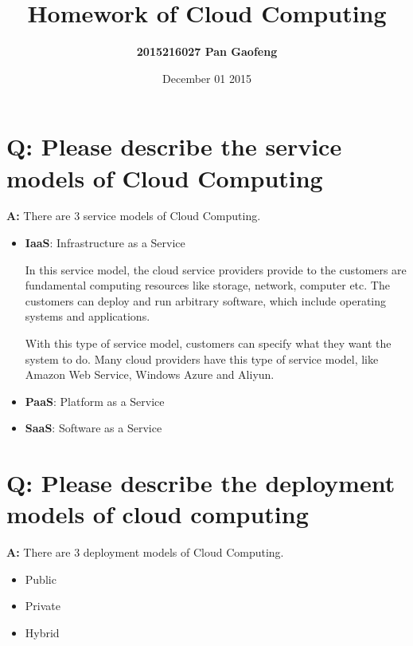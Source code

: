 \documentclass[a4paper]{article}
\title{Homework of Cloud Computing}
\author{\Large \textbf{2015216027 \hspace{2cm} Pan Gaofeng}}
\date{December 01 2015}
\begin{document}
\Large
\maketitle

\section{ Q: Please describe the service models of Cloud Computing}

\hspace{1cm}\textbf{A:} There are 3 service models of Cloud Computing.

\begin{itemize}
\item \textbf{IaaS}: Infrastructure as a Service

In this service model, the cloud service providers provide to the customers are fundamental computing resources like storage, network, computer etc. The customers can deploy and run arbitrary software, which include operating systems and applications. 

With this type of service model, customers can specify what they want the system to do. Many cloud providers have this type of service model, like Amazon Web Service, Windows Azure and Aliyun.

\vspace{2mm} 

\item \textbf{PaaS}: Platform as a Service


\vspace{2mm} 

\item \textbf{SaaS}: Software as a Service

\vspace{2mm} 

\end{itemize}


\vspace{5mm} 


\section{ Q: Please describe the deployment models of cloud computing}

\hspace{1cm}\textbf{A:} There are 3 deployment models of Cloud Computing.
\begin{itemize}
\item Public

\item Private

\item Hybrid

\end{itemize}
\end{document}
